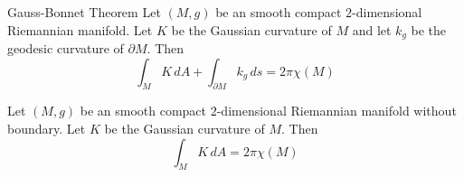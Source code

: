 \documentclass[a4paper]{article}
\begin{document}
\begin{thm}{Gauss-Bonnet Theorem}{} Let $(M,g)$ be an smooth compact $2$-dimensional Riemannian manifold. Let $K$ be the Gaussian curvature of $M$ and let $k_g$ be the geodesic curvature of $\partial M$. Then $$\int_MK\,dA+\int_{\partial M}k_g\,ds=2\pi\chi(M)$$
\end{thm}

\begin{crl}{}{} Let $(M,g)$ be an smooth compact $2$-dimensional Riemannian manifold without boundary. Let $K$ be the Gaussian curvature of $M$. Then $$\int_MK\,dA=2\pi\chi(M)$$
\end{crl}
\end{document}
